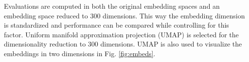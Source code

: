 Evaluations are computed in both the original embedding spaces and an embedding space reduced to 300 dimensions.
This way the embedding dimension is standardized and performance can be compared while controlling for this factor.
Uniform manifold approximation projection (UMAP) \cite{mcinnes_umap_2020} is selected for the dimensionality reduction to 300 dimensions.
UMAP is also used to visualize the embeddings in two dimensions in Fig. \ref{fig:embeds}.